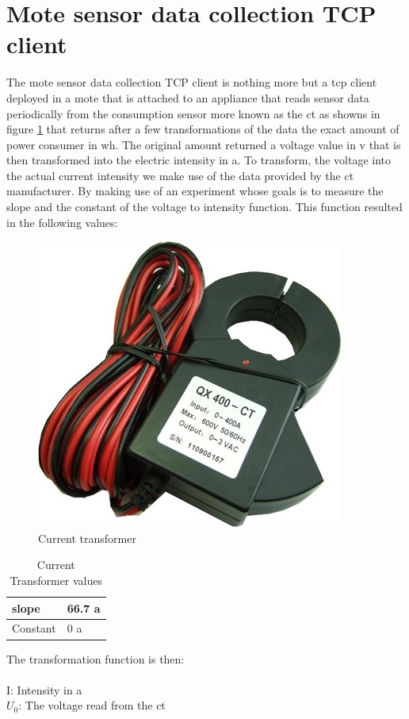 \documentclass[oneside,12pt,a4paper,final]{book}
\begin{document}
\section{Mote sensor data collection TCP client}
The mote sensor data collection TCP client is nothing more but a \gls{tcp} client deployed in a mote that is attached to an appliance that reads sensor data periodically from the consumption sensor more known as the \gls{ct}  as showns in figure \ref{fig:current_transformer} that returns after a few transformations of the data the exact amount of power consumer in \gls{wh}. The original amount returned a voltage value in \gls{v} that is then transformed into the electric intensity in \gls{a}. To transform, the voltage into the actual current intensity we make use of the data provided by the \gls{ct} manufacturer. By making use of an experiment whose goals is to measure the slope and the constant of the voltage to intensity function. This function resulted in the following values:

\begin{figure}[htbp]
\centering
\includegraphics[scale=0.8]{img/ct.jpg}
\caption{Current transformer}
\label{fig:current_transformer}
\end{figure}

\begin{table}
    \begin{tabular}{ll}
    \hline
    slope    & 66.7 \gls{a} \\ \hline
    Constant & 0 \gls{a}    \\ \hline
    \end{tabular}
    \caption{Current Transformer values}
        \label{table:CT_vals}
\end{table}
The transformation function is then: \\
 \\
I: Intensity in \gls{a} \\
$U_0$: The voltage read from the \gls{ct}
\end{document}
